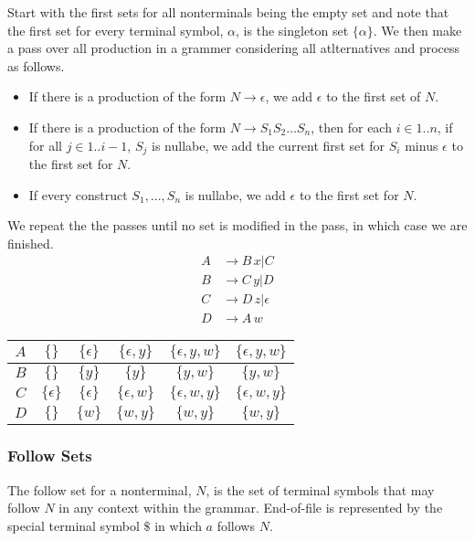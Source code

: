 Start with the first sets for all nonterminals being the empty set and note that the first set for every terminal symbol, $\alpha$, is the singleton set $\{\alpha\}$.
We then make a pass over all production in a grammer considering all atlternatives and process as follows.
\begin{itemize}
    \item If there is a production of the form $N \rightarrow \epsilon$, we add $\epsilon$ to the first set of $N$.
    \item If there is a production of the form $N \rightarrow S_1 S_2 \dots S_n$, then for each $i \in 1..n$, if for all $j \in 1..i-1$, $S_j$ is nullabe, we add the current first set for $S_i$ minus $\epsilon$ to the first set for $N$.
    \item If every construct $S_1,...,S_n$ is nullabe, we add $\epsilon$ to the first set for $N$. 
\end{itemize}
We repeat the the passes until no set is modified in the pass, in which case we are finished.
\begin{align*}
    A &\rightarrow B\,x | C\\
    B &\rightarrow C\,y | D\\
    C &\rightarrow D\,z | \epsilon\\
    D &\rightarrow A\,w
\end{align*}
\begin{center}
\begin{tabular}{|c|c|c|c|c|c|}
    \hline
    $A$ & $\{\}$ & $\{\epsilon\}$ & $\{\epsilon,y\}$ &  $\{\epsilon,y,w\}$ &  $\{\epsilon,y,w\}$\\
    \hline
    $B$ & $\{\}$ & $\{y\}$ & $\{y\}$ &  $\{y,w\}$ &  $\{y,w\}$\\
    \hline
    $C$ & $\{\epsilon\}$ & $\{\epsilon\}$ & $\{\epsilon,w\}$ &  $\{\epsilon,w,y\}$ &  $\{\epsilon,w,y\}$\\
    \hline
    $D$ & $\{\}$ & $\{w\}$ & $\{w,y\}$ &  $\{w,y\}$ &  $\{w,y\}$\\
    \hline
\end{tabular}
\end{center}



\subsubsection{Follow Sets}
The follow set for a nonterminal, $N$, is the set of terminal symbols that may follow $N$ in any context within the grammar.
End-of-file is represented by the special terminal symbol $\$$ in which $a$ follows $N$.

